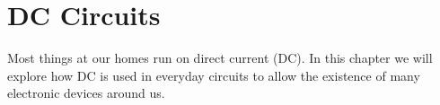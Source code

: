 \documentclass[../main.tex]{subfiles}
\begin{document}
	\section{DC Circuits}
	\begin{preamb}
		Most things at our homes run on direct current (DC). In this chapter we will explore how DC is used in everyday circuits to allow the existence of many electronic devices around us.
	\end{preamb}	
\end{document}
